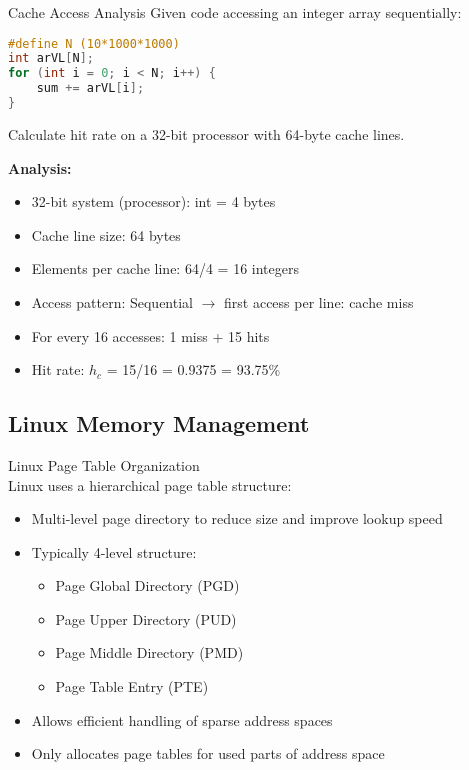 \begin{example2}{Cache Access Analysis}
    Given code accessing an integer array sequentially:
    
\begin{lstlisting}[language=C, style=basesmol]
#define N (10*1000*1000)
int arVL[N];
for (int i = 0; i < N; i++) {
    sum += arVL[i];
}
\end{lstlisting}

Calculate hit rate on a 32-bit processor with 64-byte cache lines.

    \tcblower
    
    \textbf{Analysis:}
    \begin{itemize}
        \item 32-bit system (processor): int = 4 bytes
        \item Cache line size: 64 bytes
        \item Elements per cache line: 64/4 = 16 integers
        \item Access pattern: Sequential $\rightarrow$ first access per line: cache miss
        \item For every 16 accesses: 1 miss + 15 hits
        \item Hit rate: $h_c$ = 15/16 = 0.9375 = 93.75\%
    \end{itemize}
\end{example2}

\raggedcolumns
\pagebreak

\subsection{Linux Memory Management}


\begin{definition}{Linux Page Table Organization}\\
    Linux uses a hierarchical page table structure:
    \begin{itemize}
        \item Multi-level page directory to reduce size and improve lookup speed
        \item Typically 4-level structure:
            \begin{itemize}
                \item Page Global Directory (PGD)
                \item Page Upper Directory (PUD)
                \item Page Middle Directory (PMD)
                \item Page Table Entry (PTE)
            \end{itemize}
        \item Allows efficient handling of sparse address spaces
        \item Only allocates page tables for used parts of address space
    \end{itemize}
\end{definition}

